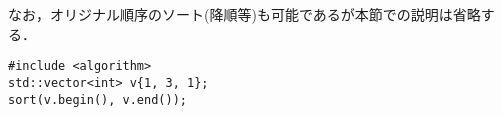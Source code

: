 なお，オリジナル順序のソート(降順等)も可能であるが本節での説明は省略する．
\begin{lstlisting}[label=cd:vector_sort,caption=vector value sorting]
#include <algorithm>
std::vector<int> v{1, 3, 1};
sort(v.begin(), v.end());
\end{lstlisting}

